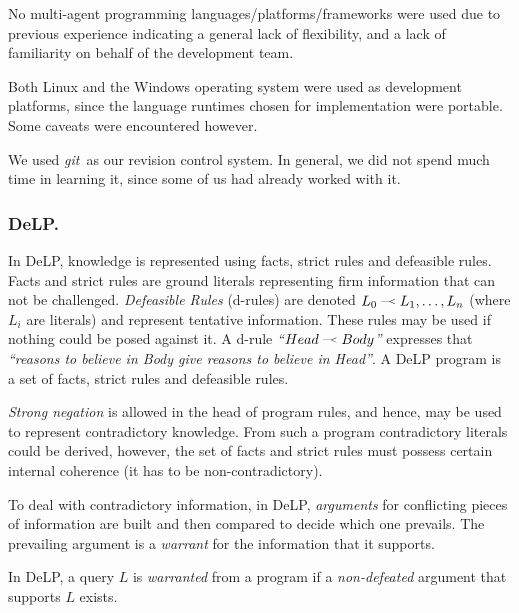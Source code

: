 \documentclass{llncs2e/llncs}
\begin{document}
    No multi-agent programming languages/platforms/frameworks were used due to 
    previous experience indicating a general lack of flexibility, and a lack of 
    familiarity on behalf of the development team.
    
    Both Linux and the Windows operating system were used as development 
    platforms, since the language runtimes chosen for implementation were 
    portable. Some caveats were encountered however.

    We used \textit{git}\ as our revision control system. In general, we did 
    not spend much time in learning it, since some of us had already worked 
    with it.
    
\subsubsection{DeLP.}
    
    \newcommand{\drule}[2]{\mbox{$ #1\; \defleftarrow \; #2$}}
    \newcommand{\defleftarrow}{{\raise1.5pt\hbox{\tiny\defleft}}}
    \newcommand{\defleft}{\mbox{---\hspace{-1.5pt}\raise.05pt\hbox{$<$}}}

    In DeLP\cite{Garcia:2004a}, knowledge is represented using facts, strict rules
    and defeasible rules. Facts and strict rules are ground literals representing
    firm information that can not be challenged. \textit{Defeasible Rules}
    (d-rules) are denoted $\drule{L_0}{L_1, \ldots, L_n}$ (where $L_i$ are literals)
    and represent tentative information. These rules may be used if nothing could
    be posed against it. A d-rule \textit{``\drule{Head}{Body}''} expresses that
    \textit{``reasons to believe in Body give reasons to believe in Head''}. A DeLP
    program is a set of facts, strict rules and defeasible rules. 

    {\it Strong negation} is allowed in the head of program rules, and hence, may
    be used to represent contradictory knowledge. From such a program contradictory
    literals could be derived, however,  the set of facts and strict rules must
    possess certain internal coherence (it has to be non-contradictory). 

    To deal with contradictory information, in DeLP, \emph{arguments} for
    conflicting pieces of information are built and then compared to decide which
    one prevails. The prevailing argument is a \emph{warrant} for the information
    that it supports.

    In DeLP, a query $L$ is \emph{warranted} from a program if a \emph{non-defeated}
    argument that supports $L$ exists. %
\end{document}
